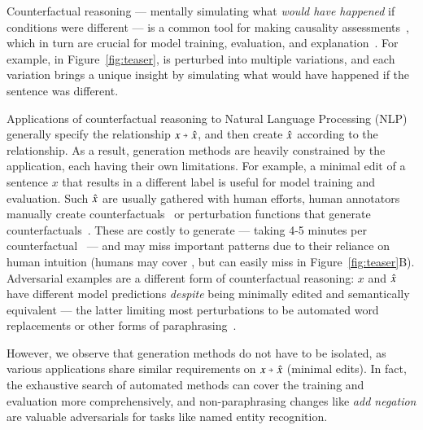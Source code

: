 Counterfactual reasoning --- mentally simulating what \emph{would have happened} if conditions were different --- is a common tool for making causality assessments~\cite{kahneman}, which in turn are crucial for model training, evaluation, and explanation~\cite{miller}. 
For example, in Figure~\ref{fig:teaser},  is perturbed into multiple variations, and each variation brings a unique insight by simulating what would have happened if the sentence was different.

Applications of counterfactual reasoning to Natural Language Processing (NLP) generally specify the relationship $x \veryshortarrow \xp$, and then create $\hat{x}$ according to the relationship.
As a result, generation methods are heavily constrained by the application, each having their own limitations.
For example, a minimal edit of a sentence $x$ that results in a different label is useful for model training and evaluation.
Such $\hat{x}$ are usually gathered with human efforts, \ie human annotators manually create counterfactuals~\cite{gardner2020contrast} or perturbation functions that generate counterfactuals~\cite{wu2019errudite}.
These are costly to generate --- taking 4-5 minutes per counterfactual~\cite{kaushik2019learning} --- and may miss important patterns due to their reliance on human intuition (\eg humans may cover , but can easily miss  in Figure~\ref{fig:teaser}B).
Adversarial examples are a different form of counterfactual reasoning: $x$ and $\hat{x}$ have different model predictions \emph{despite} being minimally edited and semantically equivalent --- the latter limiting most perturbations to be automated word replacements or other forms of paraphrasing~\cite{iyyer2018adversarial, ribeiro2018semantically}.

However, we observe that generation methods do not have to be isolated, as various applications share similar requirements on $x\veryshortarrow\xp$ (\eg minimal edits).
In fact, the exhaustive search of automated methods can cover the training and evaluation more comprehensively, and non-paraphrasing changes like \emph{add negation} are valuable adversarials for tasks like named entity recognition. 

